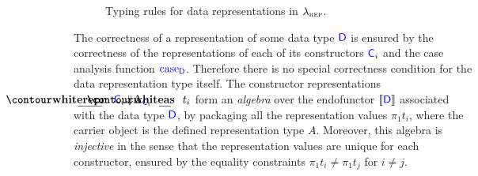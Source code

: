 \begin{figure}[h]
  \caption{Typing rules for data representations in $\lambda_{\textsc{rep}}$.}
  \label{fig:lambdarep-rules}
\end{figure}

The correctness of a representation of some data type ${\color{blue}{\mathsf{D}}}$ is ensured by
the correctness of the representations of each of its constructors ${\color{blue}{\mathsf{C}}}_i$
and the case analysis function ${\color{blue}{\mathsf{\textrm{case}_{D}}}}$. Therefore there is no special
correctness condition for the data representation type itself. The constructor
representations $\Sreprvar{R}{\lab{C}_i}{\Crepr{\Delta_{\lab{C}_i}}}{t_i}$ form
an \emph{algebra} over the endofunctor $\llbracket {\ensuremath{\color{blue}{\mathsf{D}}}} \rrbracket$
associated with the data type ${\color{blue}{\mathsf{D}}}$, by packaging all the representation
values $\pi_1 t_i$, where the carrier object is the defined representation type
$A$. Moreover, this algebra is \emph{injective} in the sense that the
representation values are unique for each constructor, ensured by the equality
constraints $\pi_1 t_i \neq \pi_1 t_j$ for $i \neq j$.

